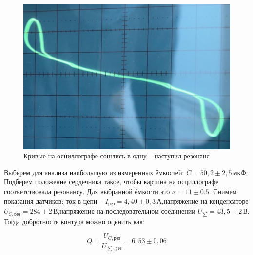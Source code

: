 \documentclass[a4paper, fontsize = 14pt]{article}
\begin{document}
\begin{figure}[hbt]
	\centering
	\includegraphics[scale=0.3]{lab48ris6.png}
	\caption{Кривые на осциллографе сошлись в одну -- наступил резонанс}
\end{figure}

Выберем для анализа наибольшую из измеренных ёмкостей: $C = 50,2 \pm 2,5\, мкФ$. Подберем положение сердечника такое, чтобы картина на осциллографе соответствовала резонансу. Для выбранной ёмкости это $x = 11 \pm 0.5$. Снимем показания датчиков: ток в цепи -- $I_{рез} = 4,40 \pm 0,3 \, А$,напряжение на конденсаторе $U_{C, рез} = 284\pm2 \, В$,напряжение на последовательном соединении $U_{\sum} = 43,5 \pm 2 \, В$. Тогда добротность контура можно оценить как:

\begin{equation}
	Q = \frac{U_{C, рез}}{U_{\sum, рез}} = 6,53 \pm 0,06 
\end{equation}
\end{document}
